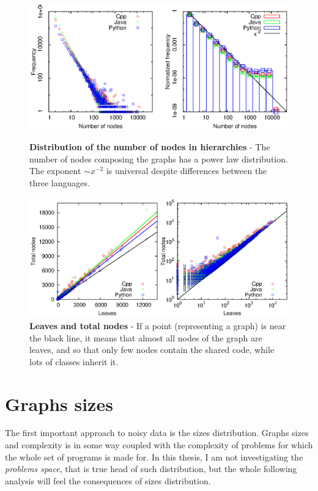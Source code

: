 \begin{figure}[p]%
\includegraphics[width=\textwidth,draft=false]{grafici/fDNnodes.eps}
\caption{\label{Fnodes} \footnotesize\textbf{Distribution of the number of nodes in hierarchies} - The number of nodes composing the graphs has a power law distribution. The exponent $\sim x^{-2}$ is universal despite differences between the three languages.}
\vspace{1cm}
\includegraphics[width=\textwidth,draft=false]{grafici/leavesnodes.eps}
\caption{\label{Fleanodes} \footnotesize\textbf{Leaves and total nodes} - If a point (representing a graph) is near the black line, it means that almost all nodes of the graph are leaves, and so that only few nodes contain the shared code, while lots of classes inherit it.}
\end{figure}

\section{Graphs sizes}
The first important approach to noisy data is the sizes distribution. Graphs sizes and complexity is in some way coupled with the complexity of problems for which the whole set of programs is made for. In this thesis, I am not investigating the \textit{problems space}, that is true head of such distribution, but the whole following analysis will feel the consequences of sizes distribution.

